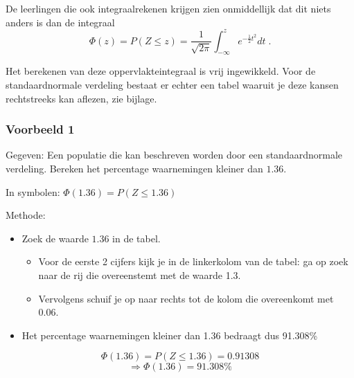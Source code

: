 \documentclass[12pt,twoside]{article}
\begin{document}
{De leerlingen die ook integraalrekenen krijgen zien onmiddellijk dat dit niets anders is dan de integraal
$$\Phi(z)=P(Z\leq z)=\dfrac{1}{\sqrt{2\pi}}\int_{-\infty}^{z}e^{-\frac{1}{2}t^2}dt\;.$$

Het berekenen van deze oppervlakteintegraal is vrij ingewikkeld. Voor de standaardnormale verdeling bestaat er echter een tabel waaruit je deze kansen rechtstreeks kan aflezen, zie bijlage.

\subsubsection*{Voorbeeld 1}

Gegeven: Een populatie die kan beschreven worden door een standaardnormale verdeling. Bereken het percentage waarnemingen kleiner dan $1.36$.

In symbolen: $\Phi(1.36)=P(Z\leq 1.36)$

Methode:
\begin{itemize}
  \item Zoek de waarde $1.36$ in de tabel.
  \begin{itemize}
    \item Voor de eerste 2 cijfers kijk je in de linkerkolom van de tabel: ga op zoek naar de rij die overeenstemt met de waarde 1.3.
    \item Vervolgens schuif je op naar rechts tot de kolom die overeenkomt met 0.06.
  \end{itemize}
  \item Het percentage waarnemingen kleiner dan 1.36 bedraagt dus 91.308\%
\end{itemize}

\begin{minipage}{0.5\textwidth}
$$\Phi(1.36)=P(Z\leq 1.36)=0.91308$$
$$\Rightarrow\Phi(1.36)=91.308\%$$
\end{minipage}
\begin{minipage}{0.5\textwidth}
\vspace*{0.8cm}
\begin{center}
\end{center}
\end{minipage}

}
\end{document}
